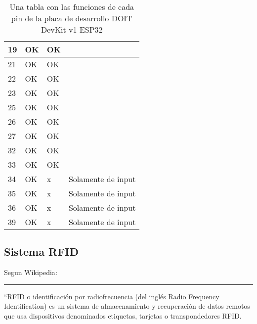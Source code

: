 \documentclass[../informe_krapp.tex]{subfiles}
\begin{document}
\begin{table}[!ht]
\begin{tabular}{|l|l|l|l|}
		19   & OK        & OK     & ~                                          \\ \hline
		21   & OK        & OK     & ~                                          \\ \hline
		22   & OK        & OK     & ~                                          \\ \hline
		23   & OK        & OK     & ~                                          \\ \hline
		25   & OK        & OK     & ~                                          \\ \hline
		26   & OK        & OK     & ~                                          \\ \hline
		27   & OK        & OK     & ~                                          \\ \hline
		32   & OK        & OK     & ~                                          \\ \hline
		33   & OK        & OK     & ~                                          \\ \hline
		34   & OK        & x      & Solamente de input                         \\ \hline
		35   & OK        & x      & Solamente de input                         \\ \hline
		36   & OK        & x      & Solamente de input                         \\ \hline
		39   & OK        & x      & Solamente de input                         \\ \hline
	\end{tabular}
	\caption{Una tabla con las funciones de cada pin de la placa de desarrollo
		DOIT DevKit v1 ESP32}
	\label{tabla-pines-esp32}
\end{table}





\clearpage
\subsection{Sistema RFID}
Segun Wikipedia\cite{wikipedia_rfid_es}:

\begin{center}
	\rule{0.8\textwidth}{0.3pt}
\end{center}
``RFID o identificación por radiofrecuencia
(del inglés Radio Frequency Identification) es un sistema de almacenamiento y recuperación
de datos remotos que usa dispositivos denominados etiquetas, tarjetas o transpondedores
RFID.
\end{document}
